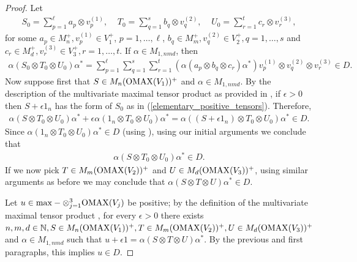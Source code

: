 \documentclass[11pt]{amsart}
\newcommand{\bb}[1]{\mathbb{#1}}
\begin{document}
\begin{proof}
Let
\begin{gather}\label{elementary_positive_tensors}
	S_{0} = \sum\limits_{p=1}^{\ell}a_{p}\otimes v_{p}^{(1)}, \;\;\;\; T_{0} = \sum\limits_{q = 1}^{s}b_{q}\otimes v_{q}^{(2)}, \;\;\;\; U_{0} = \sum\limits_{r = 1}^{t}c_{r}\otimes v_{r}^{(3)},
\end{gather}
for some $a_{p} \in M_{n}^{+}, v_{p}^{(1)} \in V_{1}^{+}$, $p = 1, \hdots, \ell$, $b_{q} \in M_{m}^{+}, v_{q}^{(2)} \in V_{2}^{+}, q = 1, \hdots, s$ and $c_{r} \in M_{d}^{+}, v_{r}^{(3)} \in V_{3}^{+}, r = 1, \hdots, t$. If $\alpha \in M_{1, nmd}$, then
\begin{gather*}
	\alpha(S_{0}\otimes T_{0}\otimes U_{0})\alpha^{*} = \sum\limits_{p=1}^{\ell}\sum\limits_{q=1}^{s}\sum\limits_{r=1}^{t}(\alpha(a_{p}\otimes b_{q}\otimes c_{r})\alpha^{*})v_{p}^{(1)}\otimes v_{q}^{(2)}\otimes v_{r}^{(3)} \in D.
\end{gather*}
\noindent Now suppose first that $S \in M_{n}({\rm OMAX}(V_{1}))^{+}$ and $\alpha \in M_{1, nmd}$. By the description of the multivariate maximal tensor product as provided in \cite[Proposition 7.2]{gt_one}, if $\epsilon > 0$ then $S+\epsilon 1_{n}$ has the form of $S_{0}$ as in (\ref{elementary_positive_tensors}). Therefore, 
\begin{gather*}
	\alpha(S\otimes T_{0}\otimes U_{0})\alpha^{*}+\epsilon \alpha(1_{n}\otimes T_{0}\otimes U_{0})\alpha^{*} = \alpha((S+\epsilon 1_{n})\otimes T_{0}\otimes U_{0})\alpha^{*} \in D.
\end{gather*}
\noindent Since $\alpha(1_{n}\otimes T_{0}\otimes U_{0})\alpha^{*} \in D$ (using \cite{ptt}), using our initial arguments we conclude that
\begin{gather*}
	\alpha(S\otimes T_{0}\otimes U_{0})\alpha^{*} \in D.
\end{gather*}
\noindent If we now pick $T \in M_{m}({\rm OMAX}(V_{2}))^{+}$ and $U \in M_{d}({\rm OMAX}(V_{3}))^{+}$, using similar arguments as before we may conclude that $\alpha(S\otimes T\otimes U)\alpha^{*} \in D$. 

Let $u \in {\rm max}-\otimes_{j=1}^{3}{\rm OMAX}(V_{j})$ be positive; by the definition of the multivariate maximal tensor product \cite{gt_one}, for every $\epsilon > 0$ there exists $n, m, d \in \bb{N}, S \in M_{n}({\rm OMAX}(V_{1}))^{+}, T \in M_{m}({\rm OMAX}(V_{2}))^{+}, U \in M_{d}({\rm OMAX}(V_{3}))^{+}$ and $\alpha \in M_{1, nmd}$ such that $u+\epsilon 1 = \alpha(S\otimes T\otimes U)\alpha^{*}$. By the previous and first paragraphs, this implies $u \in D$. 
\end{proof}
\end{document}
